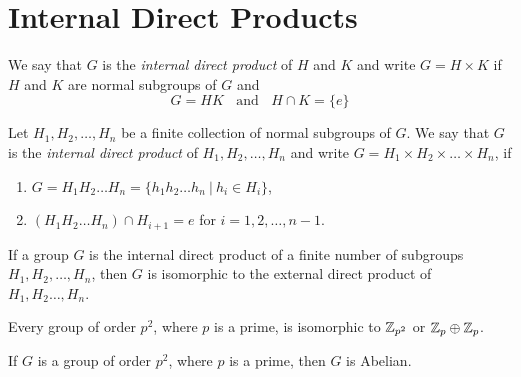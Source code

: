 \section{Internal Direct Products}

\begin{definition}
	We say that $G$ is the \textit{internal direct product} of $H$ and $K$ and write $G = H \times K$ if $H$ and $K$ are normal subgroups of $G$ and
\vspace{-1em}	\[ G = HK\ \ \ \ \text{and}\ \ \ \ H \cap K = \{e\} \]
\end{definition}

\begin{definition}
	Let $H_1, H_2,\dots,H_n$ be a finite collection of normal subgroups of $G$. We say that $G$ is the \textit{internal direct product} of $H_1,H_2,\dots,H_n$ and write $G=H_1\times H_2 \times \dots \times H_n$, if
	\begin{enumerate}
		\item $G = H_1H_2\dots H_n = \{h_1h_2\dots h_n\ \vert\ h_i \in H_i\}$,
		\item $(H_1H_2\dots H_n) \cap H_{i + 1} = {e}$ for $i=1,2,\dots, n-1$.
	\end{enumerate}
\end{definition}

\begin{theorem}
	If a group $G$ is the internal direct product of a finite number of subgroups $H_1,H_2, \dots, H_n$, then $G$ is isomorphic to the external direct product of $H_1,H_2 \dots, H_n$.
\end{theorem}

\begin{theorem}
	Every group of order $p^2$, where $p$ is a prime, is isomorphic to $\mathbb{Z}_{p^2}$ or $\mathbb{Z}_p \oplus \mathbb{Z}_p$.
\end{theorem}

\begin{corollary}
	If $G$ is a group of order $p^2$, where $p$ is a prime, then $G$ is Abelian.
\end{corollary}
